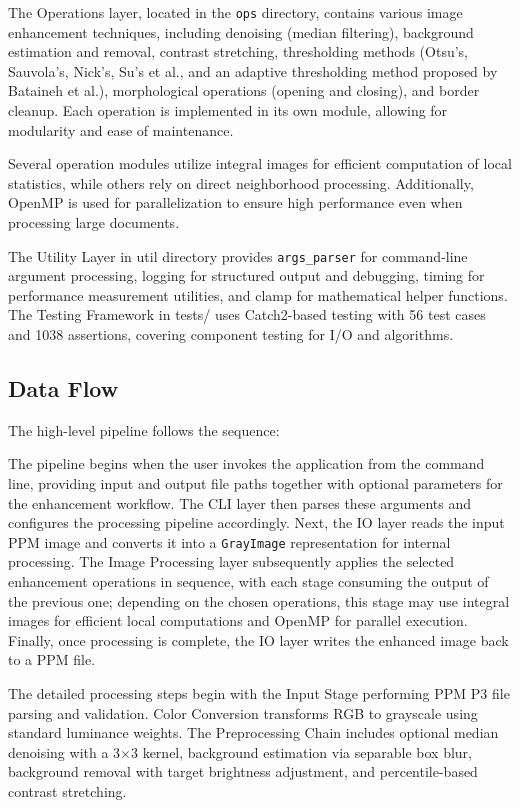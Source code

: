 The Operations layer, located in the \texttt{ops} directory, contains various image enhancement techniques, including denoising (median filtering), background estimation and removal, contrast stretching, thresholding methods (Otsu's, Sauvola's, Nick's, Su's et al., and an adaptive thresholding method proposed by Bataineh et al.), morphological operations (opening and closing), and border cleanup. Each operation is implemented in its own module, allowing for modularity and ease of maintenance.

Several operation modules utilize integral images for efficient computation of local statistics, while others rely on direct neighborhood processing. Additionally, OpenMP is used for parallelization to ensure high performance even when processing large documents.

The Utility Layer in util directory provides \texttt{args\_parser} for command-line argument processing, logging for structured output and debugging, timing for performance measurement utilities, and clamp for mathematical helper functions. The Testing Framework in tests/ uses Catch2-based testing with 56 test cases and 1038 assertions, covering component testing for I/O and algorithms.




\subsection{Data Flow}

The high-level pipeline follows the sequence:

The pipeline begins when the user invokes the application from the command line, providing input and output file paths together with optional parameters for the enhancement workflow. The CLI layer then parses these arguments and configures the processing pipeline accordingly. Next, the IO layer reads the input PPM image and converts it into a \texttt{GrayImage} representation for internal processing. The Image Processing layer subsequently applies the selected enhancement operations in sequence, with each stage consuming the output of the previous one; depending on the chosen operations, this stage may use integral images for efficient local computations and OpenMP for parallel execution. Finally, once processing is complete, the IO layer writes the enhanced image back to a PPM file.


The detailed processing steps begin with the Input Stage performing PPM P3 file parsing and validation. Color Conversion transforms RGB to grayscale using standard luminance weights. The Preprocessing Chain includes optional median denoising with a 3×3 kernel, background estimation via separable box blur, background removal with target brightness adjustment, and percentile-based contrast stretching.

